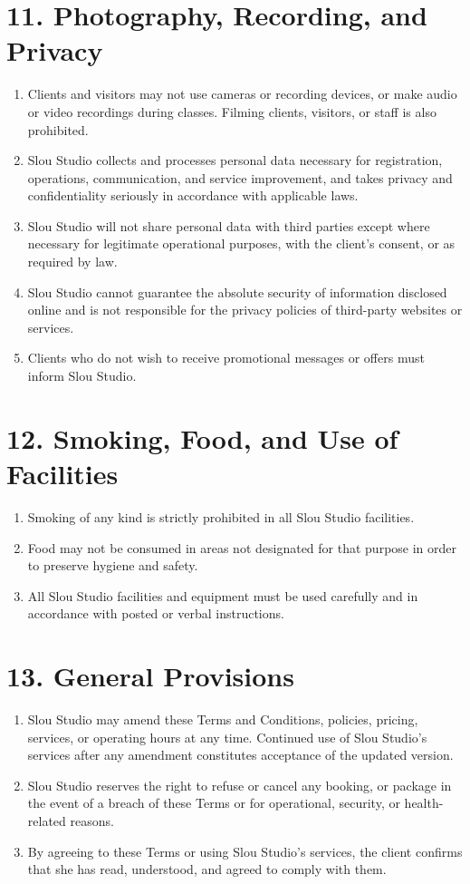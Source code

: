 \documentclass[12pt,a4paper]{article}
\begin{document}
\section*{11. Photography, Recording, and Privacy}
\begin{enumerate}
    \item Clients and visitors may not use cameras or recording devices, or make audio or video recordings during classes. Filming clients, visitors, or staff is also prohibited.
    \item Slou Studio collects and processes personal data necessary for registration, operations, communication, and service improvement, and takes privacy and confidentiality seriously in accordance with applicable laws.
    \item Slou Studio will not share personal data with third parties except where necessary for legitimate operational purposes, with the client’s consent, or as required by law.
    \item Slou Studio cannot guarantee the absolute security of information disclosed online and is not responsible for the privacy policies of third-party websites or services.
    \item Clients who do not wish to receive promotional messages or offers must inform Slou Studio.
\end{enumerate}

\section*{12. Smoking, Food, and Use of Facilities}
\begin{enumerate}
    \item Smoking of any kind is strictly prohibited in all Slou Studio facilities.
    \item Food may not be consumed in areas not designated for that purpose in order to preserve hygiene and safety.
    \item All Slou Studio facilities and equipment must be used carefully and in accordance with posted or verbal instructions.
\end{enumerate}

\section*{13. General Provisions}
\begin{enumerate}
    \item Slou Studio may amend these Terms and Conditions, policies, pricing, services, or operating hours at any time. Continued use of Slou Studio’s services after any amendment constitutes acceptance of the updated version.
    \item Slou Studio reserves the right to refuse or cancel any booking, or package in the event of a breach of these Terms or for operational, security, or health-related reasons.
    \item By agreeing to these Terms or using Slou Studio’s services, the client confirms that she has read, understood, and agreed to comply with them.
\end{enumerate}
\end{document}
